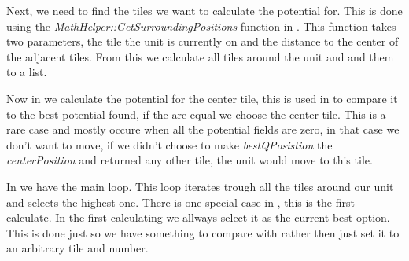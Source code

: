     Next, we need to find the tiles we want to calculate the potential for. This is done using the \textit{MathHelper::GetSurroundingPositions}  function in . This function takes two parameters, the tile the unit is currently on and the distance to the center of the adjacent tiles. From this we calculate all tiles around the unit and and them to a list.

    Now in  we calculate the potential for the center tile, this is used in  to compare it to the best potential found, if the are equal we choose the center tile. This is a rare case and mostly occure when all the potential fields are zero, in that case we don't want to move, if we didn't choose to make \textit{bestQPosistion} the \textit{centerPosition} and returned any other tile, the unit would move to this tile.
    
    In  we have the main loop. This loop iterates trough all the tiles around our unit and selects the highest one. There is one special case in , this is the first calculate. In the first calculating we allways select it as the current best option. This is done just so we have something to compare with rather then just set it to an arbitrary tile and number.
	
